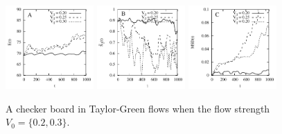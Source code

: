 \documentclass[aps,prl,preprint,groupedaddress]{revtex4-2}
\begin{document}
\begin{figure}
  \begin{center}
  \includegraphics[width=0.3\textwidth]{CTG_E.pdf}
   \includegraphics[width=0.3\textwidth]{CTG_LOP.pdf}
    \includegraphics[width=0.3\textwidth]{CTG_MSD.pdf}
  \end{center}
\caption{A checker board in Taylor-Green flows when the flow strength $V_0=\{0.2,0.3\}$. }
\end{figure}
\end{document}
